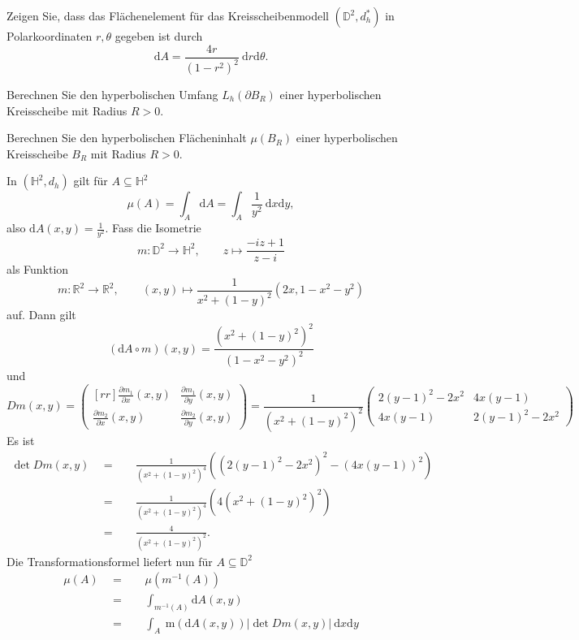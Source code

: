 \documentclass[11pt]{book}
\numberwithin{dummy}{section}
\theoremstyle{nonumberbreak}
\newenvironment{prob}[1][]{\ifthenelse{\equal{#1}{}}{\problem}{\problem[#1]}\rm}{\endproblem}
\newenvironment{sol}[1][]{\ifthenelse{\equal{#1}{}}{\solution}{\solution[#1]}\rm}{\endsolution}
\newcommand{\R}{\mathbb{R}}
\newcommand{\He}{\mathbb{H}}
\newcommand{\D}{\mathbb{D}}
\newcommand{\la}{\longrightarrow}
\begin{document}
\begin{spacing}{1.4}
\begin{prob}
\begin{compactenum}
\item Zeigen Sie, dass das Flächenelement für das Kreisscheibenmodell $(\D^2, d_h^*)$ in Polarkoordinaten $r, \theta$ gegeben ist durch 
$$\mathrm{d}A=\frac{4r}{(1-r^2)^2}\ \mathrm{d}r \mathrm{d}\theta.$$
\item Berechnen Sie den hyperbolischen Umfang $L_h(\partial B_R)$ einer hyperbolischen Kreisscheibe
mit Radius $R>0$. 
\item Berechnen Sie den hyperbolischen Flächeninhalt $\mu(B_R)$ einer hyperbolischen Kreisscheibe $B_R$ mit Radius $R>0$.
\end{compactenum}


\begin{sol}
\begin{compactenum}
\item In $(\He^2, d_h)$ gilt für $A \subseteq \He^2$
$$\mu(A) = \int_A \mathrm{d}A = \int_A \frac{1}{y^2} \ \mathrm{d}x \mathrm{d}y,$$
also $\mathrm{d}A(x,y)=\frac{1}{y^2}.$ Fass die Isometrie
$$m: \D^2 \la \He^2, \qquad z \mapsto \frac{-iz+1}{z-i}$$
als Funktion 
$$m: \R^2 \la \R^2, \qquad (x,y) \mapsto \frac{1}{x^2+(1-y)^2} \left( 2x, 1-x^2-y^2\right)$$
auf. Dann gilt 
$$(\mathrm{d}A \circ m)(x,y) = \frac{(x^2+(1-y)^2)^2}{(1-x^2-y^2)^2}$$
und 
$$D m(x,y) = \begin{pmatrix}[rr] \frac{\partial m_1}{\partial x}(x,y) & \frac{\partial m_1 }{\partial y}(x,y) \\ \frac{\partial m_2}{\partial x}(x,y) & \frac{\partial m_2}{\partial y}(x,y) \end{pmatrix} = \frac{1}{(x^2+(1-y)^2)^2} \begin{pmatrix} 2(y-1)^2-2x^2 & 4x(y-1) \\ 4x (y-1) & 2 (y-1)^2 - 2x^2 \end{pmatrix} $$
Es ist 
\begin{alignat*}{5}
\det D m(x,y)  \ \ &=&& \ \ \frac{1}{(x^2+(1-y)^2)^4} \left( (2 (y-1)^2-2x^2)^2 - (4x(y-1))^2 \right) \\
&=&& \ \ \frac{1}{(x^2+(1-y)^2)^4} \left( 4 (x^2+(1-y)^2)^2 \right) \\
&=&& \ \ \frac{4}{(x^2+(1-y)^2)^2}.
\end{alignat*}
Die Transformationsformel liefert nun für $A \subseteq \D^2$
\begin{alignat*}{5}
\mu(A) \ \ &=&& \ \ \mu(m^{-1}(A)) \\
&=&& \ \ \int_{m^{-1}(A)}  \mathrm{d}A(x,y) \\
&=&& \ \ \int_{A} \ \mathrm{m}(\mathrm{d}A(x,y)) \vert \det D m(x,y)\vert \ \mathrm{d}x \mathrm{d}y\\

\end{alignat*}
\end{compactenum}
\end{sol}
\end{prob}
\end{spacing}
\end{document}
